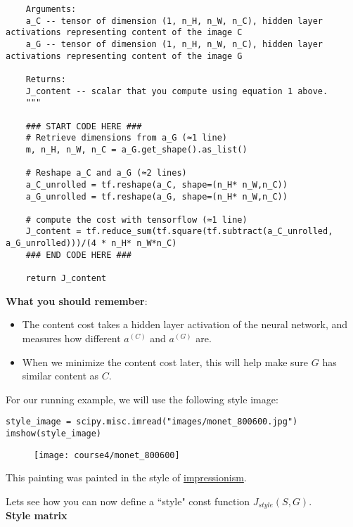{\begin{verbatim}
    Arguments:
    a_C -- tensor of dimension (1, n_H, n_W, n_C), hidden layer activations representing content of the image C 
    a_G -- tensor of dimension (1, n_H, n_W, n_C), hidden layer activations representing content of the image G
    
    Returns: 
    J_content -- scalar that you compute using equation 1 above.
    """
    
    ### START CODE HERE ###
    # Retrieve dimensions from a_G (≈1 line)
    m, n_H, n_W, n_C = a_G.get_shape().as_list()
    
    # Reshape a_C and a_G (≈2 lines)
    a_C_unrolled = tf.reshape(a_C, shape=(n_H* n_W,n_C))
    a_G_unrolled = tf.reshape(a_G, shape=(n_H* n_W,n_C))
    
    # compute the cost with tensorflow (≈1 line)
    J_content = tf.reduce_sum(tf.square(tf.subtract(a_C_unrolled, a_G_unrolled)))/(4 * n_H* n_W*n_C)
    ### END CODE HERE ###
    
    return J_content
\end{verbatim}


{\color{red}\textbf{What you should remember}:
\begin{itemize}
\item The content cost takes a hidden layer activation of the neural network, and measures how different $a^{(C)}$ and $a^{(G)}$ are. 
\item When we minimize the content cost later, this will help make sure $G$ has similar content as $C$.
\end{itemize}
}

For our running example, we will use the following style image:
\begin{verbatim}
style_image = scipy.misc.imread("images/monet_800600.jpg")
imshow(style_image)
\end{verbatim}
\begin{figure}[h]
\begin{center}
\texttt{[image: course4/monet\_800600]}
\end{center}
\end{figure}

This painting was painted in the style of \href{https://en.wikipedia.org/wiki/Impressionism}{impressionism}.

Lets see how you can now define a ``style" const function $J_{style}(S,G)$. \\

{\textbf{Style matrix}}\\

}
